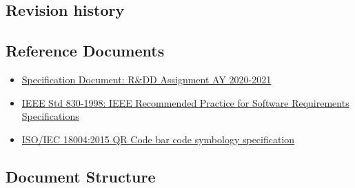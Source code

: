 \subsection{Revision history}


\subsection{Reference Documents}
\begin{itemize}
    \item \href{https://beep.metid.polimi.it/documents/121843524/23d1869d-ab17-4e36-979e-f1ccbc59be24}{Specification Document: R\&DD Assignment AY 2020-2021}
    \item \href{https://standards.ieee.org/standard/29148-2011.html}{IEEE Std 830-1998: IEEE Recommended Practice for Software Requirements Specifications}
    \item \href{https://www.iso.org/standard/62021.html}{ISO/IEC 18004:2015 QR Code bar code symbology specification}
\end{itemize}


\subsection{Document Structure}

